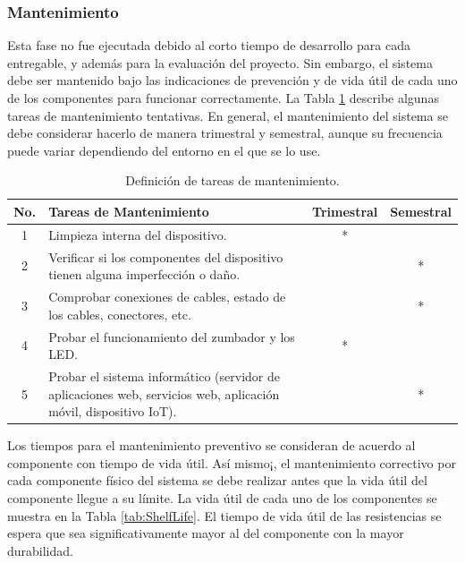 \documentclass[a4paper,fleqn]{cas-sc}
\begin{document}
			\subsubsection{Mantenimiento}
				Esta fase no fue ejecutada debido al corto tiempo de desarrollo para cada entregable, y además para la evaluación del proyecto. Sin embargo, el sistema debe ser mantenido bajo las indicaciones de prevención y de vida útil de cada uno de los componentes para funcionar correctamente. La Tabla \ref{tab:maintenance-tasks} describe algunas tareas de mantenimiento tentativas. En general, el mantenimiento del sistema se debe considerar hacerlo de manera trimestral y semestral, aunque su frecuencia puede variar dependiendo del entorno en el que se lo use.
				
				\begin{table}[h]
					\centering
					\caption{Definición de tareas de mantenimiento.}
					\label{tab:maintenance-tasks}
					\begin{tabularx}{\textwidth}{cXcc}
						\toprule
						\textbf{No.} & \textbf{Tareas de Mantenimiento} & \textbf{Trimestral} & \textbf{Semestral} \\
						\midrule
						1 & Limpieza interna del dispositivo. & * & \\
						2 & Verificar si los componentes del dispositivo tienen alguna imperfección o daño. & & * \\
						3 & Comprobar conexiones de cables, estado de los cables, conectores, etc. & & * \\
						4 & Probar el funcionamiento del zumbador y los LED. & * & \\
						5 & Probar el sistema informático (servidor de aplicaciones web, servicios web, aplicación móvil, dispositivo IoT). & & * \\
						\bottomrule
					\end{tabularx}
				\end{table}
				Los tiempos para el mantenimiento preventivo se consideran de acuerdo al componente con tiempo de vida útil. Así mismo¡, el mantenimiento correctivo por cada componente físico del sistema se debe realizar antes que la vida útil del componente llegue a su límite. La vida útil de cada uno de los componentes se muestra en la Tabla \ref{tab:ShelfLife}. El tiempo de vida útil de las resistencias se espera que sea significativamente mayor al del componente con la mayor durabilidad.
				
\end{document}
